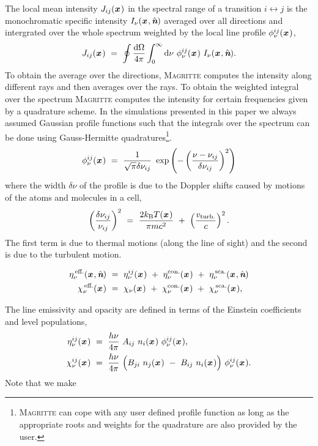 \documentclass[a4paper,fleqn,usenatbib]{mnras}
\newcommand{\kb}{k_{\text{B}}}
\newcommand{\D}{\text{d}}
\newcommand{\x}{{\textit{\textbf{x}}}\,}
\newcommand{\n}{\hat{\textit{\textbf{n}}}}
\begin{document}
The local mean intensity $J_{ij}(\x)$ in the spectral range of a transition $i \leftrightarrow j$ is the monochromatic specific intensity $I_{\nu}(\x, \n)$ averaged over all directions and intergrated over the whole spectrum weighted by the local line profile $\phi_{\nu}^{ij}(\x)$,
\begin{equation}
	J_{ij}(\x) \ = \ \oint \frac{\D\Omega}{4\pi} \int_{0}^{\infty} \D\nu \ \phi_{\nu}^{ij}(\x) \ I_{\nu}(\x, \n).
\end{equation}
To obtain the average over the directions, \textsc{Magritte} computes the intensity along different rays and then averages over the rays. To obtain the weighted integral over the spectrum \textsc{Magritte} computes the intensity for certain frequencies given by a quadrature scheme. In the simulations presented in this paper we always assumed Gaussian profile functions such that the integrals over the spectrum can be done using Gauss-Hermitte quadratures\footnote{\textsc{Magritte} can cope with any user defined profile function as long as the appropriate roots and weights for the quadrature are also provided by the user.}.
\begin{equation}
	\phi_{\nu}^{ij}(\x) \ = \ \frac{1}{\sqrt{\pi}\delta\nu_{ij}} \ \exp \left(-\left(\frac{\nu-\nu_{ij}} {\delta\nu_{ij}}\right)^{2}\right)
\end{equation}
where the width $\delta\nu$ of the profile is due to the Doppler shifts caused by motions of the atoms and molecules in a cell,
\begin{equation}
	\left(\frac{\delta\nu_{ij}}{\nu_{ij}}\right)^{2} \ = \ \frac{2 \kb T(\x)}{\pi mc^{2}} \ + \ \left(\frac{v_{\text{turb.}}}{c}\right)^{2}.
\end{equation}
The first term is due to thermal motions (along the line of sight) and the second is due to the turbulent motion.

\begin{equation}
\begin{split}
		\eta^{\,\text{eff.}}_{\nu}(\x,\n) \ &= \ \eta^{ij}_{\nu}(\x) \ + \ \eta^{\text{con.}}_{\nu}(\x) \ + \ \eta^{\,\text{sca.}}_{\nu}(\x,\n) \\
		\chi^{\,\text{eff.}}_{\nu}(\x)   \ &= \ \chi_{\nu}(\x) \ + \ \chi^{\text{con.}}_{\nu}(\x) \ + \ \chi^{\,\text{sca.}}_{\nu}(\x),
\end{split}
\label{scattering}
\end{equation}

The line emissivity and opacity are defined in terms of the Einstein coefficients and level populations,
\begin{equation}
\begin{split}
\eta^{ij}_{\nu}(\x) \ &= \ \frac{h\nu}{4\pi} \ A_{ij} \ n_{i}(\x) \ \phi^{ij}_{\nu}(\x), \\
\chi^{ij}_{\nu}(\x) \ &= \ \frac{h\nu}{4\pi} \ \Big( B_{ji} \ n_{j}(\x) \ - \ B_{ij} \ n_{i}(\x) \Big) \ \phi^{ij}_{\nu}(\x).
\end{split}
\end{equation}
Note that we make
\end{document}
